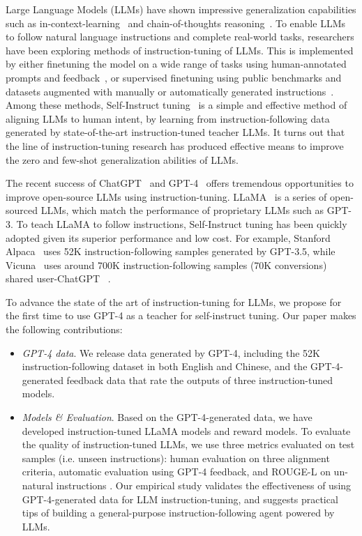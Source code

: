 Large Language Models (LLMs)  have shown impressive generalization capabilities such as in-context-learning~\citep{brown2020language} and chain-of-thoughts reasoning~\citep{wei2022chain}. To enable LLMs to follow natural language instructions and complete real-world tasks, researchers have been exploring methods of instruction-tuning of LLMs. This is implemented by either finetuning the model on a wide range of tasks using human-annotated prompts and feedback~\citep{ouyang2022training}, or supervised finetuning using public benchmarks and datasets augmented with manually or automatically generated instructions~\citep{wang2022benchmarking}. Among these methods, Self-Instruct tuning~\citep{wang2022self} is a simple and effective method of aligning LLMs to human intent, by learning from instruction-following data generated by state-of-the-art instruction-tuned teacher LLMs. It turns out that the line of instruction-tuning research has produced effective means to improve the zero and few-shot generalization abilities of LLMs.

The recent success of ChatGPT~\citep{chatgpt} and GPT-4~\citep{gpt4} offers tremendous opportunities to improve open-source LLMs using instruction-tuning. LLaMA~\citep{touvron2023llama} is a series of open-sourced LLMs, which match the performance of proprietary LLMs such as GPT-3. To teach LLaMA to follow instructions, Self-Instruct tuning has been quickly adopted given its superior performance and low cost. For example, Stanford Alpaca~\citep{alpaca} uses 52K instruction-following samples generated by GPT-3.5, while Vicuna~\citep{vicuna} uses around 700K instruction-following samples (70K conversions) shared user-ChatGPT  ~\citep{sharegpt}. 

To advance the state of the art of instruction-tuning for LLMs, we propose for the first time to use GPT-4 as a teacher for self-instruct tuning. Our paper makes the following contributions:

\begin{itemize}[leftmargin=7.5mm]

\item 
{\it GPT-4 data}. We release data generated by GPT-4, including the 52K instruction-following dataset in both English and Chinese, and the GPT-4-generated feedback data that rate the outputs of three instruction-tuned models. 

\item
{\it Models \& Evaluation}. Based on the GPT-4-generated data, we have developed instruction-tuned LLaMA models and reward models. To evaluate the quality of instruction-tuned LLMs, we use three metrics evaluated on test samples (i.e. unseen instructions): human evaluation on three alignment criteria, automatic evaluation using GPT-4 feedback, and ROUGE-L  on un-natural instructions \citep{honovich2022unnatural}. Our empirical study validates the effectiveness of using GPT-4-generated data for LLM instruction-tuning, and suggests practical tips of building a general-purpose instruction-following agent powered by LLMs. 
\end{itemize}

